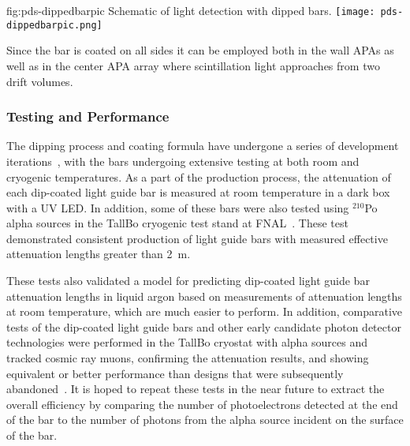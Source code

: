 \begin{dunefigure}{fig:pds-dippedbarpic}
{Schematic of light detection with dipped bars.}
  \texttt{[image: pds-dippedbarpic.png]}
\end{dunefigure}

Since the bar is coated on all sides it can be employed both in the wall APAs as well as in the center APA array where scintillation light approaches from two drift volumes.


\subsubsection{Testing and Performance}

The dipping process and coating formula have undergone a series of development iterations~\cite{Moss:2014ota},
with the bars  undergoing extensive testing at both room and cryogenic temperatures. As a part of the production process, the attenuation of each dip-coated light guide bar is measured at room temperature in a dark box with a UV LED.  In addition, some of these bars were also tested using $^{210}$Po alpha sources in the TallBo cryogenic test stand at FNAL~\cite{Moss:2016yhb}. These test demonstrated consistent production of light guide bars with measured effective attenuation lengths greater than 2~m. 

These tests also validated a model for predicting dip-coated light guide bar attenuation lengths in liquid argon based on measurements of attenuation lengths at room temperature, which are much easier to perform.  In addition, comparative tests of the dip-coated light guide bars and other early candidate photon detector technologies were performed in the TallBo cryostat with alpha sources and tracked cosmic ray muons, confirming the  attenuation results, and showing equivalent or better performance than designs that were subsequently abandoned~\cite{Whittington:2015rkr}.
It is hoped to repeat these tests in the near future to extract the overall efficiency by comparing the number of photoelectrons detected at the end of the bar to the number of photons from the alpha source incident on the surface of the bar.

